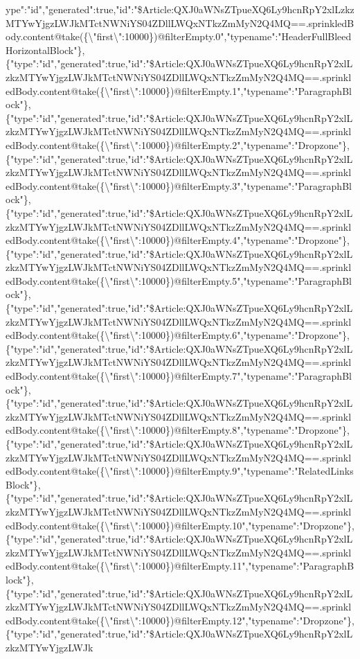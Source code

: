 ype":"id","generated":true,"id":"\$Article:QXJ0aWNsZTpueXQ6Ly9hcnRpY2xlLzkzMTYwYjgzLWJkMTctNWNiYS04ZDllLWQxNTkzZmMyN2Q4MQ==.sprinkledBody.content@take(\{\textbackslash{}"first\textbackslash{}":10000\})@filterEmpty.0","typename":"HeaderFullBleedHorizontalBlock"\},\{"type":"id","generated":true,"id":"\$Article:QXJ0aWNsZTpueXQ6Ly9hcnRpY2xlLzkzMTYwYjgzLWJkMTctNWNiYS04ZDllLWQxNTkzZmMyN2Q4MQ==.sprinkledBody.content@take(\{\textbackslash{}"first\textbackslash{}":10000\})@filterEmpty.1","typename":"ParagraphBlock"\},\{"type":"id","generated":true,"id":"\$Article:QXJ0aWNsZTpueXQ6Ly9hcnRpY2xlLzkzMTYwYjgzLWJkMTctNWNiYS04ZDllLWQxNTkzZmMyN2Q4MQ==.sprinkledBody.content@take(\{\textbackslash{}"first\textbackslash{}":10000\})@filterEmpty.2","typename":"Dropzone"\},\{"type":"id","generated":true,"id":"\$Article:QXJ0aWNsZTpueXQ6Ly9hcnRpY2xlLzkzMTYwYjgzLWJkMTctNWNiYS04ZDllLWQxNTkzZmMyN2Q4MQ==.sprinkledBody.content@take(\{\textbackslash{}"first\textbackslash{}":10000\})@filterEmpty.3","typename":"ParagraphBlock"\},\{"type":"id","generated":true,"id":"\$Article:QXJ0aWNsZTpueXQ6Ly9hcnRpY2xlLzkzMTYwYjgzLWJkMTctNWNiYS04ZDllLWQxNTkzZmMyN2Q4MQ==.sprinkledBody.content@take(\{\textbackslash{}"first\textbackslash{}":10000\})@filterEmpty.4","typename":"Dropzone"\},\{"type":"id","generated":true,"id":"\$Article:QXJ0aWNsZTpueXQ6Ly9hcnRpY2xlLzkzMTYwYjgzLWJkMTctNWNiYS04ZDllLWQxNTkzZmMyN2Q4MQ==.sprinkledBody.content@take(\{\textbackslash{}"first\textbackslash{}":10000\})@filterEmpty.5","typename":"ParagraphBlock"\},\{"type":"id","generated":true,"id":"\$Article:QXJ0aWNsZTpueXQ6Ly9hcnRpY2xlLzkzMTYwYjgzLWJkMTctNWNiYS04ZDllLWQxNTkzZmMyN2Q4MQ==.sprinkledBody.content@take(\{\textbackslash{}"first\textbackslash{}":10000\})@filterEmpty.6","typename":"Dropzone"\},\{"type":"id","generated":true,"id":"\$Article:QXJ0aWNsZTpueXQ6Ly9hcnRpY2xlLzkzMTYwYjgzLWJkMTctNWNiYS04ZDllLWQxNTkzZmMyN2Q4MQ==.sprinkledBody.content@take(\{\textbackslash{}"first\textbackslash{}":10000\})@filterEmpty.7","typename":"ParagraphBlock"\},\{"type":"id","generated":true,"id":"\$Article:QXJ0aWNsZTpueXQ6Ly9hcnRpY2xlLzkzMTYwYjgzLWJkMTctNWNiYS04ZDllLWQxNTkzZmMyN2Q4MQ==.sprinkledBody.content@take(\{\textbackslash{}"first\textbackslash{}":10000\})@filterEmpty.8","typename":"Dropzone"\},\{"type":"id","generated":true,"id":"\$Article:QXJ0aWNsZTpueXQ6Ly9hcnRpY2xlLzkzMTYwYjgzLWJkMTctNWNiYS04ZDllLWQxNTkzZmMyN2Q4MQ==.sprinkledBody.content@take(\{\textbackslash{}"first\textbackslash{}":10000\})@filterEmpty.9","typename":"RelatedLinksBlock"\},\{"type":"id","generated":true,"id":"\$Article:QXJ0aWNsZTpueXQ6Ly9hcnRpY2xlLzkzMTYwYjgzLWJkMTctNWNiYS04ZDllLWQxNTkzZmMyN2Q4MQ==.sprinkledBody.content@take(\{\textbackslash{}"first\textbackslash{}":10000\})@filterEmpty.10","typename":"Dropzone"\},\{"type":"id","generated":true,"id":"\$Article:QXJ0aWNsZTpueXQ6Ly9hcnRpY2xlLzkzMTYwYjgzLWJkMTctNWNiYS04ZDllLWQxNTkzZmMyN2Q4MQ==.sprinkledBody.content@take(\{\textbackslash{}"first\textbackslash{}":10000\})@filterEmpty.11","typename":"ParagraphBlock"\},\{"type":"id","generated":true,"id":"\$Article:QXJ0aWNsZTpueXQ6Ly9hcnRpY2xlLzkzMTYwYjgzLWJkMTctNWNiYS04ZDllLWQxNTkzZmMyN2Q4MQ==.sprinkledBody.content@take(\{\textbackslash{}"first\textbackslash{}":10000\})@filterEmpty.12","typename":"Dropzone"\},\{"type":"id","generated":true,"id":"\$Article:QXJ0aWNsZTpueXQ6Ly9hcnRpY2xlLzkzMTYwYjgzLWJk